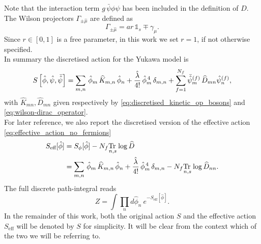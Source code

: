 Note that the interaction term $g\, \bar\psi\phi\psi$ has been included in the definition of $D$. \\
The Wilson projectors $\Gamma_{\pm \hat \mu}$ are defined as
\begin{equation*}
    \Gamma_{\pm \hat \mu} = ar \, \mathds{1}_s \mp \gamma_\mu.
\end{equation*}
Since $r \in [0,1]$ is a free parameter, in this work we set $r=1$, if not otherwise specified. \\
In summary the discretised action for the Yukawa model is 
\begin{equation}
    S\left[\hat{\phi}, \hat{\psi}, \bar{\hat{\psi}} \right] = \sum_{m,n} \, \hat{\phi}_m \, \widehat{K}_{m,n} \, \hat{\phi}_n + \frac{\hat{\lambda}}{4!} \, \hat{\phi}_m^{\,4} \, \delta_{m,n} + \sum_{f=1}^{N_f}\bar{\hat{\psi}}_m^{(f)} \, \widehat{D}_{mn} \hat{\psi}_n^{(f)},
    \label{eq:discretised_action}
\end{equation}
with $\widehat{K}_{mn}, \widehat{D}_{mn}$ given respectively by \eqref{eq:discretised_kinetic_op_bosons} and \eqref{eq:wilson-dirac_operator}. \\
For later reference, we also report the discretised version of the effective action \eqref{eq:effective_action_no_fermions}
\begin{equation}
	\begin{aligned}
		S_\text{eff}[\hat\phi] 	&= S_\phi[\hat\phi] - N_f \underset{n,s}{\operatorname{\text{Tr} \,}} \log \widehat{D} \\
							&= \sum_{m,n} \, \hat{\phi}_m \, \widehat{K}_{m,n} \, \hat{\phi}_n + \frac{\hat{\lambda}}{4!} \, \hat{\phi}_m^{\,4} \, \delta_{m,n} - N_f \underset{n,s}{\operatorname{\text{Tr} \,}} \log \widehat{D}_{nn}.
	\end{aligned}
	\label{eq:discretised_effective_action}
\end{equation}
The full discrete path-integral reads
\begin{equation}
    Z = \int \prod_n d\hat\phi_n \ e^{-S_\text{eff}[\hat\phi]}.
    \label{eq:discretised_path_integral}
\end{equation}
In the remainder of this work, both the original action $S$ and the effective action $S_\text{eff}$ will be denoted by $S$ for simplicity. It will be clear from the context which of the two we will be referring to.


